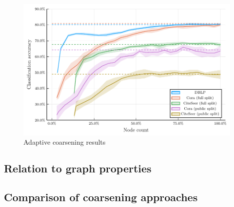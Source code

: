 \begin{figure}
  \centering
  \includegraphics[width=\linewidth]{images/adaptive-coarsening/adaptive-coarsening.pdf}
  \caption{Adaptive coarsening results}
  \label{fig:adaptive-coarsening}
\end{figure}

\subsection{Relation to graph properties}


\subsection{Comparison of coarsening approaches}
